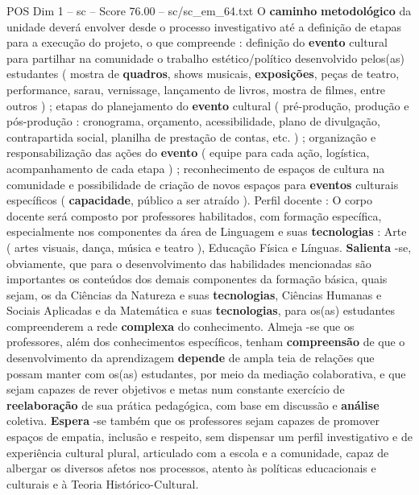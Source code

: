 \begin{textsample}{POS Dim 1 – sc – Score 76.00 – sc/sc\_em\_64.txt}
O \textbf{caminho} \textbf{metodológico} da unidade deverá envolver desde o processo investigativo até a definição de etapas para a execução do projeto, o que compreende : definição do \textbf{evento} cultural para partilhar na comunidade o trabalho estético/político desenvolvido pelos(as) estudantes ( mostra de \textbf{quadros}, shows musicais, \textbf{exposições}, peças de teatro, performance, sarau, vernissage, lançamento de livros, mostra de filmes, entre outros ) ; etapas do planejamento do \textbf{evento} cultural ( pré-produção, produção e pós-produção : cronograma, orçamento, acessibilidade, plano de divulgação, contrapartida social, planilha de prestação de contas, etc. ) ; organização e responsabilização das ações do \textbf{evento} ( equipe para cada ação, logística, acompanhamento de cada etapa ) ; reconhecimento de espaços de cultura na comunidade e possibilidade de criação de novos espaços para \textbf{eventos} culturais específicos ( \textbf{capacidade}, público a ser atraído ).
Perfil docente : O corpo docente será composto por professores habilitados, com formação específica, especialmente nos componentes da área de Linguagem e suas \textbf{tecnologias} : Arte ( artes visuais, dança, música e teatro ), Educação Física e Línguas. \textbf{Salienta} -se, obviamente, que para o desenvolvimento das habilidades mencionadas são importantes os conteúdos dos demais componentes da formação básica, quais sejam, os da Ciências da Natureza e suas \textbf{tecnologias}, Ciências Humanas e Sociais Aplicadas e da Matemática e suas \textbf{tecnologias}, para os(as) estudantes compreenderem a rede \textbf{complexa} do conhecimento.
Almeja -se que os professores, além dos conhecimentos específicos, tenham \textbf{compreensão} de que o desenvolvimento da aprendizagem \textbf{depende} de ampla teia de relações que possam manter com os(as) estudantes, por meio da mediação colaborativa, e que sejam capazes de rever objetivos e metas num constante exercício de \textbf{reelaboração} de sua prática pedagógica, com base em discussão e \textbf{análise} coletiva. \textbf{Espera} -se também que os professores sejam capazes de promover espaços de empatia, inclusão e respeito, sem dispensar um perfil investigativo e de experiência cultural plural, articulado com a escola e a comunidade, capaz de albergar os diversos afetos nos processos, atento às políticas educacionais e culturais e à Teoria Histórico-Cultural.


\end{textsample}
